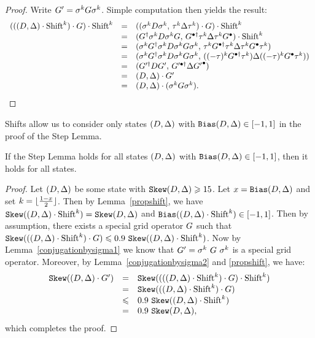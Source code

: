 \begin{proof} Write $G'=\sigma^k G\sigma^k$. Simple computation then yields the result:
\[
\begin{array}{rcl}
(((D,\Delta)\cdot \mbox{Shift}^k) \cdot G )\cdot \mbox{Shift}^k 
& = & ((\sigma^k D \sigma^k,\, \tau^k \Delta \tau^k)\cdot G )\cdot \mbox{Shift}^k \\
& = & (G^\dagger\sigma^k D \sigma^k G,\, G^{\bullet\dagger} \tau^k \Delta \tau^k G^\bullet )\cdot \mbox{Shift}^k \\
& = & (\sigma^kG^\dagger\sigma^k D \sigma^k G\sigma^k,\, \tau^k G^{\bullet\dagger} \tau^k \Delta \tau^k G^\bullet \tau^k ) \\
& = & (\sigma^kG^\dagger\sigma^k D \sigma^k G\sigma^k,\, ((-\tau)^kG^{\bullet\dagger} \tau^k )\Delta ((-\tau)^k G^\bullet \tau^k) ) \\
& = & (G'^\dagger D G',\, G'^{\bullet\dagger} \Delta {G'}^\bullet ) \\
& = & (D,\Delta) \cdot G' \\
& = & (D,\Delta) \cdot (\sigma^k G\sigma^k).
\end{array}
\]
\end{proof}

Shifts allow us to consider only states $(D,\Delta)$ with 
$\mathtt{Bias}(D,\Delta)\in[-1,1]$ in the proof of the Step Lemma.

\begin{lemma}
\label{shift_lemma}
If the Step Lemma holds for all states $(D,\Delta)$ with
$\mathtt{Bias}(D,\Delta)\in [-1,1]$, then it holds for all states.
\end{lemma}

\begin{proof}
Let $(D,\Delta)$ be some state with $\sk\state\geq\formula{\P}$. 
Let $x=\mathtt{Bias}(D,\Delta)$ and set $k=\lfloor\frac{1-x}{2}\rfloor$. Then by 
Lemma~\ref{propshift}, we have $\mathtt{Skew}((D,\Delta)\cdot\mbox{Shift}^k)= \mathtt{Skew}(D,\Delta)$ and
$\mathtt{Bias}((D,\Delta)\cdot\mbox{Shift}^k)\in[-1,1]$. Then by assumption, 
there exists a special grid operator $G$ such that 
$\sk((\state\cdot\shift^k)\cdot \G)\leq \formula{\Qstep}~\sk(\state 
\cdot\shift^k)$. Now by Lemma~\ref{conjugationbysigma1} 
we know that $G'=\sigma^k ~G~ \sigma^k$ is a special 
grid operator. Moreover, by 
Lemma~\ref{conjugationbysigma2} and \ref{propshift}, 
we have:
\[
\begin{array}{rcl}
\sk(\state\cdot \G') & = & \sk(((\state\cdot\shift^k)\cdot \G)\cdot \shift^k) \\
& = & \sk((\state \cdot\shift^k)\cdot \G) \\
& \leq & \formula{\Qstep}~\sk(\state \cdot\shift^k) \\
& = & \formula{\Qstep}~\sk\state ,
\end{array}
\]
which completes the proof.
\end{proof}

